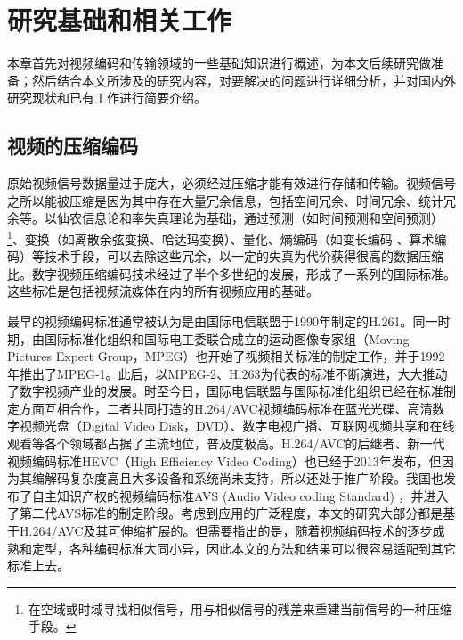\chapter{研究基础和相关工作}

本章首先对视频编码和传输领域的一些基础知识进行概述，为本文后续研究做准备；然后结合本文所涉及的研究内容，对要解决的问题进行详细分析，并对国内外研究现状和已有工作进行简要介绍。

\section{视频的压缩编码}

原始视频信号数据量过于庞大，必须经过压缩才能有效进行存储和传输。视频信号之所以能被压缩是因为其中存在大量冗余信息，包括空间冗余、时间冗余、统计冗余等\supercite{Gao-book-2010}。以仙农信息论\supercite{Shannon-1948}和率失真理论\supercite{Berger-book-1984}为基础，通过预测（如时间预测和空间预测）\footnote{在空域或时域寻找相似信号，用与相似信号的残差来重建当前信号的一种压缩手段。}、变换（如离散余弦变换\supercite{Rao-1990}、哈达玛变换\supercite{Pratt-1969}）、量化\supercite{Gray-TIT1997}、熵编码（如变长编码\supercite{Huffman-1952} 、算术编码\supercite{Rissanen-1979}）等技术手段，可以去除这些冗余，以一定的失真为代价获得很高的数据压缩比。数字视频压缩编码技术经过了半个多世纪的发展，形成了一系列的国际标准。这些标准是包括视频流媒体在内的所有视频应用的基础。

最早的视频编码标准通常被认为是由国际电信联盟于1990年制定的H.261\supercite{H.261}。同一时期，由国际标准化组织和国际电工委联合成立的运动图像专家组（Moving Pictures Expert Group，MPEG）也开始了视频相关标准的制定工作，并于1992年推出了MPEG-1\supercite{MPEG1}。此后，以MPEG-2\supercite{MPEG2}、H.263\supercite{H.263}为代表的标准不断演进，大大推动了数字视频产业的发展。时至今日，国际电信联盟与国际标准化组织已经在标准制定方面互相合作，二者共同打造的H.264/AVC视频编码标准在蓝光光碟、高清数字视频光盘（Digital Video Disk，DVD）、数字电视广播、互联网视频共享和在线观看等各个领域都占据了主流地位，普及度极高。H.264/AVC的后继者、新一代视频编码标准HEVC（High Efficiency Video Coding）\supercite{HEVCOverview}也已经于2013年发布，但因为其编解码复杂度高且大多设备和系统尚未支持，所以还处于推广阶段。我国也发布了自主知识产权的视频编码标准AVS (Audio Video coding Standard) \supercite{AVS}，并进入了第二代AVS标准的制定阶段。考虑到应用的广泛程度，本文的研究大部分都是基于H.264/AVC及其可伸缩扩展的。但需要指出的是，随着视频编码技术的逐步成熟和定型，各种编码标准大同小异，因此本文的方法和结果可以很容易适配到其它标准上去。

